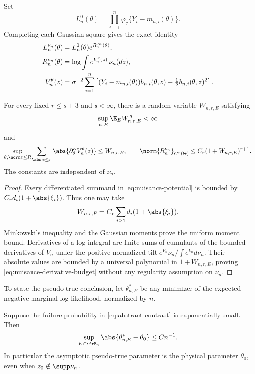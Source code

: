 Set
\[
 L_n^0(\theta)=\prod_{i=1}^n
 \varphi_\sigma\{Y_i-m_{n,i}(\theta)\}.
\]
Completing each Gaussian square gives the exact identity
\begin{align}
 L_n^{\nu_n}(\theta)&=L_n^0(\theta)e^{R_n^{\nu_n}(\theta)},
 \label{eq:nuisance-factorization}\\
 R_n^{\nu_n}(\theta)&=\log\int e^{V_n^\theta(z)}\,\nu_n(dz),\notag\\
 V_n^\theta(z)&=\sigma^{-2}\sum_{i=1}^n
 \left[(Y_i-m_{n,i}(\theta))b_{n,i}(\theta,z)
       -\tfrac12b_{n,i}(\theta,z)^2\right].
 \label{eq:nuisance-potential}
\end{align}

\begin{lemma}
\label{lem:nuisance-budget}
For every fixed \(r\le s+3\) and \(q<\infty\), there is a random variable
\(W_{n,r,E}\) satisfying
\[
 \sup_{n,E}\E_E W_{n,r,E}^{\,q}<\infty
\]
and
\begin{equation}
 \sup_{\theta,\norm z\le R}
 \sum_{\abs\alpha\le r}
 \abs{\partial_\theta^\alpha V_n^\theta(z)}
 \le W_{n,r,E},
 \qquad
 \norm{R_n^{\nu_n}}_{C^r(\Theta)}
 \le C_r(1+W_{n,r,E})^{r+1}.
 \label{eq:nuisance-derivative-budget}
\end{equation}
The constants are independent of \(\nu_n\).
\end{lemma}

\begin{proof}
Every differentiated summand in \eqref{eq:nuisance-potential} is bounded by
\(C_rd_i(1+\abs{\xi_i})\).  Thus one may take
\[
 W_{n,r,E}=C_r\sum_{i\ge1}d_i(1+\abs{\xi_i}).
\]
Minkowski's inequality and the Gaussian moments prove the uniform moment
bound.  Derivatives of a log integral are finite sums of cumulants of the
bounded derivatives of \(V_n\) under the positive normalized tilt
\(e^{V_n}\nu_n/\int e^{V_n}d\nu_n\).  Their absolute values are bounded by a
universal polynomial in \(1+W_{n,r,E}\), proving
\eqref{eq:nuisance-derivative-budget} without any regularity assumption on
\(\nu_n\).
\end{proof}

To state the pseudo-true conclusion, let \(\theta_{n,E}^*\) be any minimizer
of the expected negative marginal log likelihood, normalized by \(n\).

\begin{proposition}
\label{prop:pseudotrue}
Suppose the failure probability in \eqref{eq:abstract-contrast} is
exponentially small.  Then
\[
 \sup_{E\in\frE_n}\abs{\theta_{n,E}^*-\theta_0}\le Cn^{-1}.
\]
In particular the asymptotic pseudo-true parameter is the physical parameter
\(\theta_0\), even when \(z_0\notin\supp\nu_n\).
\end{proposition}

